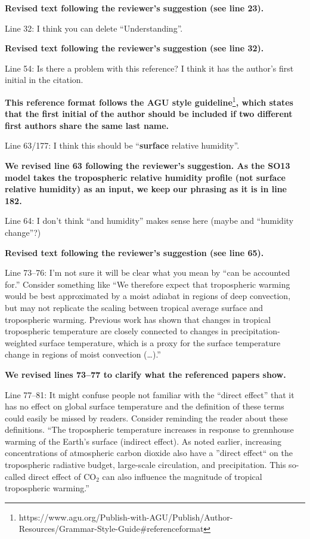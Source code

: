 \documentclass[11pt]{article}
\begin{document}
\textbf{Revised text following the reviewer's suggestion (see line 23).}

Line 32: I think you can delete ``Understanding''.

\textbf{Revised text following the reviewer's suggestion (see line 32).}

Line 54: Is there a problem with this reference? I think it has the author's first initial in the citation.

\textbf{This reference format follows the AGU style guideline}\footnote{https://www.agu.org/Publish-with-AGU/Publish/Author-Resources/Grammar-Style-Guide\#referenceformat}\textbf{, which states that the first initial of the author should be included if two different first authors share the same last name.}

Line 63/177: I think this should be ``\textbf{surface} relative humidity''.

\textbf{We revised line 63 following the reviewer's suggestion. As the SO13 model takes the tropospheric relative humidity profile (not surface relative humidity) as an input, we keep our phrasing as it is in line 182.}

Line 64: I don't think ``and humidity'' makes sense here (maybe and ``humidity change''?)

\textbf{Revised text following the reviewer's suggestion (see line 65).}

Line 73--76: I'm not sure it will be clear what you mean by ``can be accounted for.'' Consider something like ``We therefore expect that tropospheric warming would be best approximated by a moist adiabat in regions of deep convection, but may not replicate the scaling between tropical average surface and tropospheric warming. Previous work has shown that changes in tropical tropospheric temperature are closely connected to changes in precipitation-weighted surface temperature, which is a proxy for the surface temperature change in regions of moist convection (\ldots{}).''

\textbf{We revised lines 73--77 to clarify what the referenced papers show.}

Line 77--81: It might confuse people not familiar with the ``direct effect'' that it has no effect on global surface temperature and the definition of these terms could easily be missed by readers. Consider reminding the reader about these definitions. ``The tropospheric temperature increases in response to grennhouse warming of the Earth's surface (indirect effect). As noted earlier, increasing concentrations of atmospheric carbon dioxide also have a ''direct effect`` on the tropospheric radiative budget, large-scale circulation, and precipitation. This so-called direct effect of CO\(_2\) can also influence the magnitude of tropical tropospheric warming.''
\end{document}
